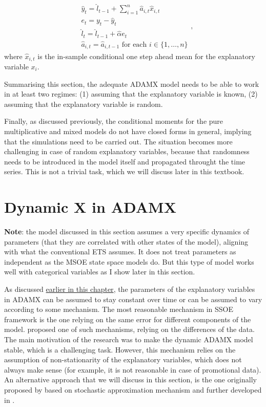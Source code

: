 \documentclass[
]{book}
\theoremstyle{definition}
\theoremstyle{definition}
\theoremstyle{definition}
\theoremstyle{definition}
\theoremstyle{remark}
\begin{document}
\begin{equation}
  \begin{aligned}
    & \hat{y}_{t} = \hat{l}_{t-1} + \sum_{i=1}^n \hat{a}_{i,t} \hat{x}_{i,t} \\
    & e_t = y_t - \hat{y}_{t} \\
    & \hat{l}_{t} = \hat{l}_{t-1} + \hat{\alpha} e_t \\
    & \hat{a}_{i,t} = \hat{a}_{i,t-1} \text{ for each } i \in \{1, \dots, n\}
  \end{aligned},
  \label{eq:ADAMETSXANNStepAhead}
\end{equation}
where \(\hat{x}_{i,t}\) is the in-sample conditional one step ahead mean for the explanatory variable \(x_i\).

Summarising this section, the adequate ADAMX model needs to be able to work in at least two regimes: (1) assuming that the explanatory variable is known, (2) assuming that the explanatory variable is random.

Finally, as discussed previously, the conditional moments for the pure multiplicative and mixed models do not have closed forms in general, implying that the simulations need to be carried out. The situation becomes more challenging in case of random explanatory variables, because that randomness needs to be introduced in the model itself and propagated throught the time series. This is not a trivial task, which we will discuss later in this textbook.

\hypertarget{ADAMXDynamic}{%
\section{Dynamic X in ADAMX}\label{ADAMXDynamic}}

\textbf{Note}: the model discussed in this section assumes a very specific dynamics of parameters (that they are correlated with other states of the model), aligning with what the conventional ETS assumes. It does not treat parameters as independent as the MSOE state space models do. But this type of model works well with categorical variables as I show later in this section.

As discussed \protect\hyperlink{ADAMX}{earlier in this chapter}, the parameters of the explanatory variables in ADAMX can be assumed to stay constant over time or can be assumed to vary according to some mechanism. The most reasonable mechanism in SSOE framework is the one relying on the same error for different components of the model. \citet{Osman2015} proposed one of such mechanisms, relying on the differences of the data. The main motivation of the research was to make the dynamic ADAMX model stable, which is a challenging task. However, this mechanism relies on the assumption of non-stationarity of the explanatory variables, which does not always make sense (for example, it is not reasonable in case of promotional data). An alternative approach that we will discuss in this section, is the one originally proposed by \citet{Svetunkov1985} based on stochastic approximation mechanism and further developed in \citet{Svetunkov2014Textbook}.
\end{document}
